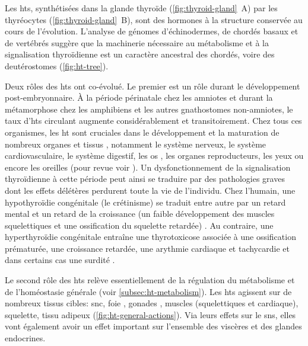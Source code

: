 \documentclass[../main.tex]{subfiles}
\begin{document}
	

	Les \glspl{ht}, synthétisées dans la glande thyroïde (\autoref{fig:thyroid-gland}~A) par les thyréocytes (\autoref{fig:thyroid-gland}~B), sont des hormones à la structure conservée au cours de l'évolution.
	L'analyse de génomes d'échinodermes, de chordés basaux et de vertébrés suggère que la machinerie nécessaire au métabolisme et à la signalisation thyroïdienne est un caractère ancestral des chordés, voire des deutérostomes \citep{Paris2008} (\autoref{fig:ht-tree}).

	

	Deux rôles des \glspl{ht} ont co-évolué.
	Le premier est un rôle durant le développement post-embryonnaire.
	À la période périnatale chez les amniotes et durant la métamorphose chez les amphibiens et les autres gnathostomes non-amniotes, le taux d'\glspl{ht} circulant augmente considérablement et transitoirement.
	Chez tous ces organismes, les \gls{ht} sont cruciales dans le développement et la maturation de nombreux organes et tissus \citep{Boelaert2005}, notamment le système nerveux, le système cardiovasculaire, le système digestif, les os \citep{Wojcicka2013a}, les organes reproducteurs, les yeux ou encore les oreilles (pour revue voir \citealp{Wagner2008,Ojamaa2010}).
	Un dysfonctionnement de la signalisation thyroïdienne à cette période peut ainsi se traduire par des pathologies graves dont les effets délétères perdurent toute la vie de l'individu.
	Chez l'humain, une hypothyroïdie congénitale (le crétinisme) se traduit entre autre par un retard mental et un retard de la croissance (un faible développement des muscles squelettiques et une ossification du squelette retardée) \citep{Zimmermann2009}.
	Au contraire, une hyperthyroïdie congénitale entraîne une thyrotoxicose associée à une ossification prématurée, une croissance retardée, une arythmie cardiaque et tachycardie et dans certains cas une surdité \citep{Krude1997}.
	\par
	Le second rôle des \glspl{ht} relève essentiellement de la régulation du métabolisme et de l'homéostasie générale (voir \autoref{subsec:ht-metabolism}).
	Les \glspl{ht} agissent sur de nombreux tissus cibles: \gls{snc}, foie \citep{Weitzel2003}, gonades \citep{Wagner2008}, muscles (squelettiques et cardiaque), squelette, tissu adipeux (\autoref{fig:ht-general-actions}).
	Via leurs effets sur le \gls{sns}, elles vont également avoir un effet important sur l'ensemble des viscères et des glandes endocrines.
\end{document}
